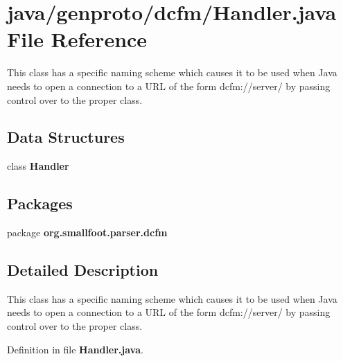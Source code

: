 \section{java/genproto/dcfm/\+Handler.java File Reference}
\label{genproto_2dcfm_2Handler_8java}


This class has a specific naming scheme which causes it to be used when Java needs to open a connection to a U\+R\+L of the form dcfm\+://server/ by passing control over to the proper class.  


\subsection*{Data Structures}
\begin{DoxyCompactItemize}
\item 
class {\bf Handler}
\end{DoxyCompactItemize}
\subsection*{Packages}
\begin{DoxyCompactItemize}
\item 
package {\bf org.\+smallfoot.\+parser.\+dcfm}
\end{DoxyCompactItemize}


\subsection{Detailed Description}
This class has a specific naming scheme which causes it to be used when Java needs to open a connection to a U\+R\+L of the form dcfm\+://server/ by passing control over to the proper class. 



Definition in file {\bf Handler.\+java}.

